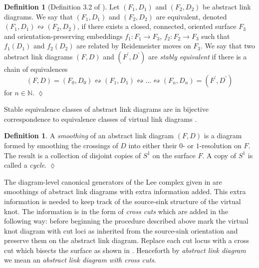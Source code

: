 \documentclass[10pt,oneside]{amsart}
\theoremstyle{definition}
\newtheorem{definition}[theorem]{Definition}
\numberwithin{equation}{section}
\DeclareRobustCommand{\CloseDef}{	\leavevmode\unskip\penalty9999 \hbox{}\nobreak\hfill
	\quad\hbox{$\lozenge$}}
\begin{document}
\begin{definition}[Definition 3.2 of \cite{Carter2000}]
\label{Def:CKS1}
Let \( \left( F_1, D_1 \right) \) and \( \left( F_2, D_2 \right) \) be abstract link diagrams. We say that \( \left( F_1, D_1 \right) \) and \( \left( F_2, D_2 \right) \) are equivalent, denoted \( \left( F_1, D_1 \right) \leftrightsquigarrow \left( F_2, D_2 \right) \), if there exists a closed, connected, oriented surface \( F_3 \) and orientation-preserving embeddings \( f_1 : F_1 \rightarrow F_3 \), \( f_2 : F_2 \rightarrow F_3 \) such that \( f_1 ( D_1 ) \) and \( f_2 ( D_2 ) \) are related by Reidemeister moves on \( F_3 \). We say that two abstract link diagrams \( \left( F, D \right) \) and \( \left( F^{\prime}, D^{\prime} \right) \) are \emph{stably equivalent} if there is a chain of equivalences
\begin{equation*}
\left( F, D \right) = \left( F_0, D_0 \right) \leftrightsquigarrow \left( F_1, D_1 \right) \leftrightsquigarrow \dots \leftrightsquigarrow \left( F_n, D_n \right) = \left( F^{\prime}, D^{\prime} \right)
\end{equation*}
for \( n \in \mathbb{N} \).\CloseDef
\end{definition}

Stable equivalence classes of abstract link diagrams are in bijective correspondence to equivalence classes of virtual link diagrams \cite{Kamada2000}.

\begin{definition}
\label{Def:abstractsmoothing}
	A \emph{smoothing} of an abstract link diagram \( \left( F , D \right) \) is a diagram formed by smoothing the crossings of \( D \) into either their \( 0 \)- or \( 1 \)-resolution on \( F \). The result is a collection of disjoint copies of \( S^1 \) on the surface \( F \). A copy of \( S^1 \) is called a \emph{cycle}.\CloseDef
\end{definition}

The diagram-level canonical generators of the Lee complex given in \cite{Dye2014} are smoothings of abstract link diagrams with extra information added. This extra information is needed to keep track of the source-sink structure of the virtual knot. The information is in the form of \textit{cross cuts} which are added in the following way: before beginning the procedure described above mark the virtual knot diagram with cut loci as inherited from the source-sink orientation and preserve them on the abstract link diagram. Replace each cut locus with a cross cut which bisects the surface as shown in . Henceforth by \textit{abstract link diagram} we mean an \textit{abstract link diagram with cross cuts}.
\end{document}
